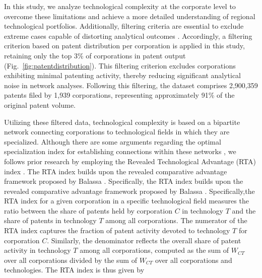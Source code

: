 In this study, we analyze technological complexity at the corporate level to overcome these limitations and achieve a more detailed understanding of regional technological portfolios. 
Additionally, filtering criteria are essential to exclude extreme cases capable of distorting analytical outcomes \cite{Hidalgo2021,PintarScherngell2022}. Accordingly, a filtering criterion based on patent distribution per corporation  is applied in this study, retaining only the top 3\% of corporations in patent output (Fig.~\ref{fig:patentdistribution}). This filtering criterion excludes corporations exhibiting minimal patenting activity, thereby reducing significant analytical noise in network analyses. Following this filtering, the dataset comprises 2,900,359 patents filed by 1,939 corporations, representing approximately 91\% of the original patent volume.

Utilizing these filtered data, technological complexity is based on a bipartite network connecting corporations to technological fields in which they are specialized. Although there are some arguments regarding the optimal specialization index for establishing connections within these networks \cite{PintarScherngell2022}, we follows prior research by employing the Revealed Technological Advantage (RTA) index \cite{Soete1987}.
The RTA index builds upon the revealed comparative advantage framework proposed by Balassa \cite{Balassa1965}. Specifically, the RTA index builds upon the revealed comparative advantage framework proposed by Balassa \cite{Balassa1965}. 
Specifically,the RTA index for a given corporation in a specific technological field measures the ratio between the share of patents held by corporation \(C\) in technology \(T\) and the share of patents in technology \(T\) among all corporations.
The numerator of the RTA index captures the fraction of patent activity devoted to technology \(T\) for corporation \(C\). 
Similarly, the denominator reflects the overall share of patent activity in technology \(T\) among all corporations, computed as the sum of \(W_{CT}\) over all corporations divided by the sum of \(W_{CT}\) over all corporations and technologies.
The RTA index is thus given by

